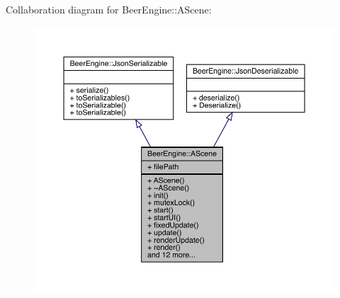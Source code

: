 Collaboration diagram for Beer\+Engine\+:\+:A\+Scene\+:\nopagebreak
\begin{figure}[H]
\begin{center}
\leavevmode
\includegraphics[width=350pt]{class_beer_engine_1_1_a_scene__coll__graph}
\end{center}
\end{figure}
